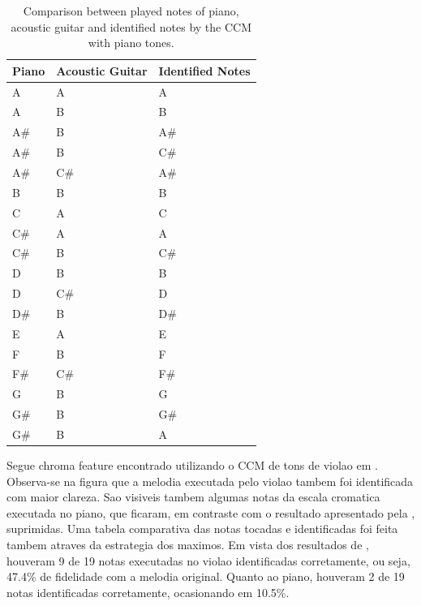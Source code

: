 \documentclass{article}
\begin{document}
	\begin{table}[h]
	 \begin{center}
	 \begin{tabular}{|l|l|l|}
	  \hline
	  Piano & Acoustic Guitar & Identified Notes \\
	  \hline
		A	& A	& A \\
		A	&    B	&    B \\
		A\#	&    B	&    A\# \\
		A\#	&    B	&    C\# \\
		A\#	&    C\#	&    A\# \\
		B	&    B	&    B \\
		C	&    A	&    C \\
		C\#	&    A	&    A \\
		C\#	&    B	&    C\# \\
		D	&    B	&    B \\
		D	&    C\#	&    D \\
		D\#	&    B	&    D\# \\
		E	&    A	&    E \\
		F	&    B	&    F \\
		F\#	&    C\#	&    F\# \\
		G	&    B	&    G \\
		G\#	&    B	&    G\# \\
		G\#	&    B	&    A \\
	  \hline
	 \end{tabular}
	\end{center}
	 \caption{Comparison between played notes of piano, acoustic guitar and identified notes by the CCM with piano tones.}
	 \label{tab:table-2-ccm-piano}
	\end{table}

\newpage
Segue chroma feature encontrado utilizando o CCM de tons de violao em . Observa-se na figura que a melodia executada pelo violao tambem foi identificada com maior clareza. Sao visiveis tambem algumas notas da escala cromatica executada no piano, que ficaram, em contraste com o resultado apresentado pela , suprimidas. Uma tabela comparativa das notas tocadas e identificadas foi feita tambem atraves da estrategia dos maximos. Em vista dos resultados de , houveram 9 de 19 notas executadas no violao identificadas corretamente, ou seja, 47.4\% de fidelidade com a melodia original. Quanto ao piano, houveram 2 de 19 notas identificadas corretamente, ocasionando em 10.5\%.
	
\end{document}
